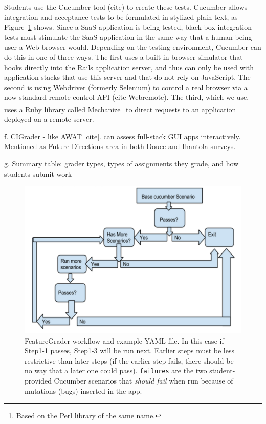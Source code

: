 Students use the Cucumber tool (cite) to create these tests.
Cucumber allows integration and acceptance tests to be formulated in
stylized plain text, as Figure~\ref{fig:cucumber} shows.
Since a SaaS application is being tested, black-box integration tests
must stimulate the SaaS application in the same way that
a human being user a Web browser would.
Depending on the testing environment, Cucumber can do this in one of
three ways.  The first uses a built-in browser simulator that hooks
directly into 
the Rails application server, and thus can only be used
with application stacks that use this server and that do not rely on
JavaScript.  The second is using Webdriver (formerly 
Selenium) to control a real browser via a now-standard remote-control
API (cite Webremote).  The third, which we use, uses a Ruby library called
Mechanize\footnote{Based on the Perl library of the same name.} to
direct requests to an application deployed on  a remote server.  


f.	CIGrader - like AWAT [cite]. can assess full-stack GUI apps interactively. Mentioned as Future  Directions area in both Douce and Ihantola surveys.

g.	Summary table: grader types, types of assignments they grade, and how students submit work



\begin{figure}
  \begin{minipage}{0.45\textwidth}%
  \includegraphics[width=\textwidth]{figs/feature_grader.pdf}%
  \end{minipage}%
  \begin{minipage}{0.55\textwidth}%
  \end{minipage}
  \caption{\label{fig:cucumber}%
FeatureGrader workflow and example YAML file.  In this case if Step1-1 passes,
Step1-3 will be run next.  Earlier steps must be less restrictive than
later steps (if the earlier step fails, there should be no way that a later one could pass).
\texttt{failures} are the two student-provided Cucumber scenarios that \emph{should fail} when
run because of mutations (bugs) inserted in the app.
}
\end{figure}
